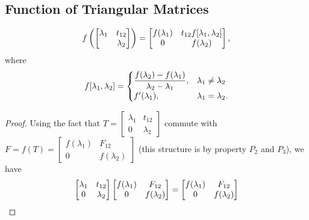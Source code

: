 \documentclass{article}
\begin{document}
\subsection{Function of Triangular Matrices}

\begin{example}
    \begin{equation}\notag
        f\left(
        \begin{bmatrix}
            \lambda_1 & t_{12} \\ & \lambda_2
        \end{bmatrix}
        \right) = 
        \begin{bmatrix}
            f(\lambda_1) & t_{12}f[\lambda_1,\lambda_2] \\ 0 & f(\lambda_2)
        \end{bmatrix},
    \end{equation}
    where 
    \begin{equation}\notag
        f[\lambda_1,\lambda_2] = 
        \begin{cases}
            \displaystyle \frac{f(\lambda_2) - f(\lambda_1)}{\lambda_2 - \lambda_1}, & \lambda_1 \neq \lambda_2 \\
            f'(\lambda_1), & \lambda_1 = \lambda_2.
        \end{cases}
    \end{equation}
    \begin{proof}
        Using the fact that $T = \begin{bmatrix} \lambda_1 & t_{12} \\ 0
        & \lambda_2 \end{bmatrix}$ commute with $F = f(T) =
        \begin{bmatrix} f(\lambda_1)  & F_{12} \\ 0 & f(\lambda_2)
        \end{bmatrix}$ (this structure is by property $P_2$ and $P_3$),
        we have 
        \begin{equation}\notag
            \begin{bmatrix} \lambda_1 & t_{12} \\ 0 & \lambda_2 \end{bmatrix}
            \begin{bmatrix} f(\lambda_1)  & F_{12} \\ 0 & f(\lambda_2) \end{bmatrix} = 
            \begin{bmatrix} f(\lambda_1)  & F_{12} \\ 0 & f(\lambda_2) \end{bmatrix}

\end{equation}
\end{proof}
\end{example}
\end{document}
